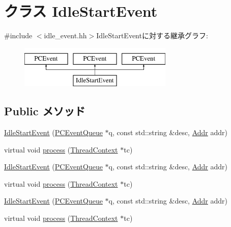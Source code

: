 \hypertarget{classIdleStartEvent}{
\section{クラス IdleStartEvent}
\label{classIdleStartEvent}
}


{\ttfamily \#include $<$idle\_\-event.hh$>$}IdleStartEventに対する継承グラフ:\begin{figure}[H]
\begin{center}
\leavevmode
\includegraphics[height=2cm]{classIdleStartEvent}
\end{center}
\end{figure}
\subsection*{Public メソッド}
\begin{DoxyCompactItemize}
\item 
\hyperlink{classIdleStartEvent_a6c28e9bbae2fd0051649013c91a6eaa3}{IdleStartEvent} (\hyperlink{classPCEventQueue}{PCEventQueue} $\ast$q, const std::string \&desc, \hyperlink{base_2types_8hh_af1bb03d6a4ee096394a6749f0a169232}{Addr} addr)
\item 
virtual void \hyperlink{classIdleStartEvent_ad66a9d5ec7cfe597b848a17c0df5cc28}{process} (\hyperlink{classThreadContext}{ThreadContext} $\ast$tc)
\item 
\hyperlink{classIdleStartEvent_a6c28e9bbae2fd0051649013c91a6eaa3}{IdleStartEvent} (\hyperlink{classPCEventQueue}{PCEventQueue} $\ast$q, const std::string \&desc, \hyperlink{base_2types_8hh_af1bb03d6a4ee096394a6749f0a169232}{Addr} addr)
\item 
virtual void \hyperlink{classIdleStartEvent_a7f662d4151352761d86b966fcd5d41f6}{process} (\hyperlink{classThreadContext}{ThreadContext} $\ast$tc)
\item 
\hyperlink{classIdleStartEvent_a6c28e9bbae2fd0051649013c91a6eaa3}{IdleStartEvent} (\hyperlink{classPCEventQueue}{PCEventQueue} $\ast$q, const std::string \&desc, \hyperlink{base_2types_8hh_af1bb03d6a4ee096394a6749f0a169232}{Addr} addr)
\item 
virtual void \hyperlink{classIdleStartEvent_a7f662d4151352761d86b966fcd5d41f6}{process} (\hyperlink{classThreadContext}{ThreadContext} $\ast$tc)
\end{DoxyCompactItemize}


